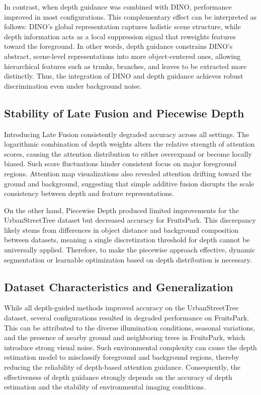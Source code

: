 In contrast, when depth guidance was combined with DINO, performance improved in most configurations. This complementary effect can be interpreted as follows: DINO’s global representation captures holistic scene structure, while depth information acts as a local suppression signal that reweights features toward the foreground. In other words, depth guidance constrains DINO’s abstract, scene-level representations into more object-centered ones, allowing hierarchical features such as trunks, branches, and leaves to be extracted more distinctly. Thus, the integration of DINO and depth guidance achieves robust discrimination even under background noise.

\subsection{Stability of Late Fusion and Piecewise Depth}
Introducing Late Fusion consistently degraded accuracy across all settings. The logarithmic combination of depth weights alters the relative strength of attention scores, causing the attention distribution to either overexpand or become locally biased. Such score fluctuations hinder consistent focus on major foreground regions. Attention map visualizations also revealed attention drifting toward the ground and background, suggesting that simple additive fusion disrupts the scale consistency between depth and feature representations.

On the other hand, Piecewise Depth produced limited improvements for the UrbanStreetTree dataset but decreased accuracy for FruitsPark. This discrepancy likely stems from differences in object distance and background composition between datasets, meaning a single discretization threshold for depth cannot be universally applied. Therefore, to make the piecewise approach effective, dynamic segmentation or learnable optimization based on depth distribution is necessary.

\subsection{Dataset Characteristics and Generalization}
While all depth-guided methods improved accuracy on the UrbanStreetTree dataset, several configurations resulted in degraded performance on FruitsPark. This can be attributed to the diverse illumination conditions, seasonal variations, and the presence of nearby ground and neighboring trees in FruitsPark, which introduce strong visual noise. Such environmental complexity can cause the depth estimation model to misclassify foreground and background regions, thereby reducing the reliability of depth-based attention guidance. Consequently, the effectiveness of depth guidance strongly depends on the accuracy of depth estimation and the stability of environmental imaging conditions.

